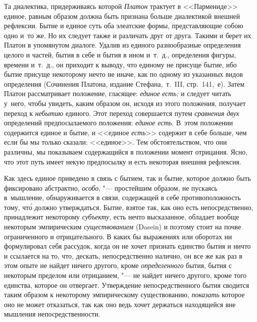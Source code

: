 Та диалектика, придерживаясь которой {\em Платон} трактует в <<Пармениде>>
единое, равным образом должна быть признана больше диалектикой внешней
рефлексии. Бытие и единое суть оба элеатские формы, представляющие собою одно
и~то же. Но их следует также и различать друг от друга. Такими и берет их
Платон в упомянутом диалоге. Удалив из единого разнообразные определения целого
и частей, бытия в себе и бытия в ином и~т.~д., определения фигуры, времени
и~т.~д., он приходит к выводу, что единому не присуще бытие, ибо бытие присуще
некоторому нечто не иначе, как по одному из указанных видов определения
(Сочинения Платона, издание Стефана,~т.~III, стр.~141,~е). Затем Платон
рассматривает положение, гласящее: {\em единое} {\em есть;} и следует читать
у~него, чтобы увидеть, каким образом он, исходя из этого положения, получает
переход к {\em небытию} единого. Этот переход совершается путем {\em сравнения
двух} определений предпосылаемого положения: {\em единое есть}. В~этом
положении содержится единое и бытие, и <<единое {\em есть}>> содержит в себе
больше, чем если бы мы только сказали: <<единое>>. Тем обстоятельством, что они
различны, мы показываем содержащийся в положении момент отрицания. Ясно, что
этот путь имеет некую предпосылку и есть некоторая внешняя рефлексия.

Как здесь единое приведено в связь с бытием, так и бытие, которое должно быть
фиксировано абстрактно, {\em особо}, "--- простейшим образом, не пускаясь
в~мышление, обнаруживается в связи, содержащей в себе противоположность тому,
чт\'{о} должно утверждаться. Бытие, взятое так, как оно есть непосредственно,
принадлежит некоторому {\em субъекту}, есть нечто высказанное, обладает вообще
некоторым эмпирическим {\em существованием} (Dasein) и поэтому стоит на почве
ограниченного и отрицательного. В каких бы выражениях или оборотах ни
формулировал себя рассудок, когда он не хочет признать единство бытия и ничто и
ссылается на то, что, дескать, непосредственно налично, он все же как раз в
этом опыте не найдет ничего другого, кроме {\em определенного} бытия, бытия с
некоторым пределом или отрицанием, "--- не найдет ничего другого, кроме того
единства, которое он отвергает. Утверждение непосредственного бытия сводится
таким образом к некоторому эмпирическому существованию, {\em показать} которое
оно не может отказаться, так как оно ведь хочет держаться находящейся вне
мышления непосредственности.

